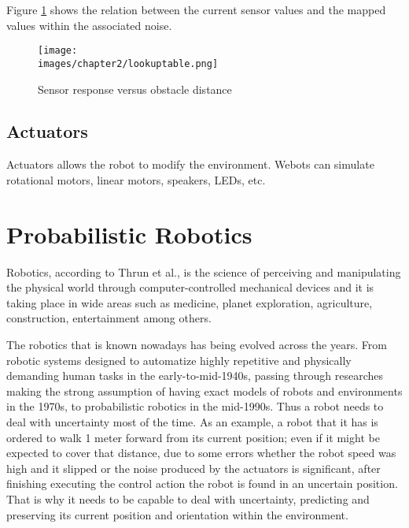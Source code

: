 Figure \ref{fig:ch-2:lookup} shows the relation between the current sensor values and the mapped values within the associated noise.

\begin{figure}[h!]
  \centering
  \texttt{[image: \\images/chapter2/lookuptable.png]}
  \caption{Sensor response versus obstacle distance}
  \label{fig:ch-2:lookup}
\end{figure}

\subsection{Actuators}

Actuators allows the robot to modify the environment. Webots can simulate rotational motors, linear motors, speakers, LEDs, etc. 

\section{Probabilistic Robotics}

Robotics, according to Thrun et al.\cite{Thrun:2005:PR:1121596}, is the science of perceiving and manipulating the physical world through computer-controlled mechanical devices and it is taking place in wide areas such as medicine\cite{Azad:STAR}, planet exploration\cite{Geoffrey:venus}, agriculture\cite{Shamshiri:research-agricultural}, construction\cite{Pileun:construction}, entertainment\cite{Morris:entertainment} among others. 

The robotics that is known nowadays has being evolved across the years. From robotic systems designed to automatize highly repetitive and physically demanding human tasks in the early-to-mid-1940s\cite{Ferreira:prob}, passing through researches making the strong assumption of having exact models of robots and environments in the 1970s, to probabilistic robotics in the mid-1990s\cite{Thrun:robotic-statistics}. Thus a robot needs to deal with uncertainty most of the time. As an example, a robot that it has is ordered to walk 1 meter forward from its current position; even if it might be expected to cover that distance, due to some errors whether the robot speed was high and it slipped or the noise produced by the actuators is significant, after finishing executing the control action the robot is found in an uncertain position. That is why it needs to be capable to deal with uncertainty, predicting and preserving its current position and orientation within the environment\cite{Nikos:auxiliary-pf}.

